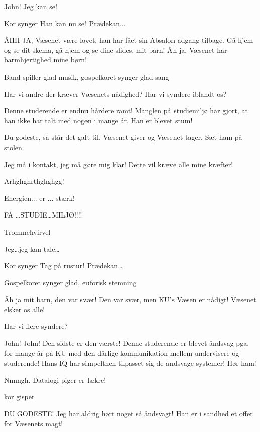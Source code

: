 \documentclass[a4paper,12pt]{article}
\begin{document}
\begin{sketch}
 John! Jeg kan se!

\scene Kor synger Han kan nu se! Prædekan...

 ÅHH JA, Væsenet være lovet, han har fået sin Absalon adgang tilbage. Gå hjem og se dit skema, gå hjem og se dine slides, mit barn! Åh ja, Væsenet har barmhjertighed mine børn!

\scene Band spiller glad musik, gospelkoret synger glad sang

 Har vi andre der kræver Væsenets nådighed? Har vi syndere iblandt os?


 Denne studerende er endnu hårdere ramt! Manglen på  studiemiljø har gjort, at han ikke har talt med nogen i mange år. Han er blevet stum!

 Du godeste, så står det galt til. Væsenet giver og Væsenet tager. Sæt ham på stolen.

  Jeg må i kontakt, jeg må gøre mig klar! Dette vil kræve alle mine kræfter!

 Arhghghrthghghgg!

 Energien... er ... stærk! 

 FÅ \ldots STUDIE\ldots MILJØ!!!!

\scene Trommehvirvel

 Jeg\dots jeg kan tale\ldots

\scene Kor synger Tag på rustur! Prædekan\ldots

\scene Gospelkoret synger glad, euforisk stemning

 Åh ja mit barn, den var svær! Den var svær, men KU's Væsen er nådigt! Væsenet elsker os alle!

 Har vi flere syndere? 

 John! John! Den sidste er den værste! Denne studerende er blevet åndsvag pga. for mange år på KU med den dårlige kommunikation mellem undervisere og studerende! Hans IQ har simpelthen tilpasset sig de åndsvage systemer! Hør ham!

 Nnnngh. Datalogi-piger er lækre!

\scene kor gisper

 DU GODESTE! Jeg har aldrig hørt noget så åndsvagt! Han er i sandhed et offer for Væsenets magt!


\end{sketch}
\end{document}
